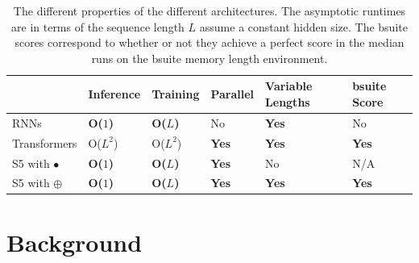 \documentclass{article}
\newcommand{\oldop}{\bullet}
\newcommand{\newop}{\oplus}
\begin{document}
\begin{table}[t]
\centering
\begin{tabular}{l|lllll}
               & Inference     & Training      & Parallel     & Variable Lengths & bsuite Score \\ \hline
RNNs           & \textbf{O($1$)} & \textbf{O($L$)} & No           & \textbf{Yes}     & No           \\
Transformers   & O($L^2$)         & O($L^2$)         & \textbf{Yes} & \textbf{Yes}     & \textbf{Yes} \\
S5 with $\oldop$  & \textbf{O($1$)} & \textbf{O($L$)} & \textbf{Yes} & No               & N/A          \\
S5 with $\newop$ & \textbf{O($1$)} & \textbf{O($L$)} & \textbf{Yes} & \textbf{Yes}     & \textbf{Yes}
\end{tabular}
\vspace{1em}
\caption{The different properties of the different architectures. The asymptotic runtimes are in terms of the sequence length $L$ assume a constant hidden size. The bsuite scores correspond to whether or not they achieve a perfect score in the median runs on the bsuite memory length environment.}
\end{table}
\section{Background}
\label{sec:Background}
\end{document}
